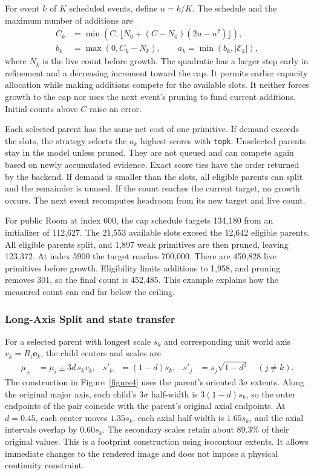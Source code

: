 For event $k$ of $K$ scheduled events, define $u=k/K$. The schedule and the maximum number of additions are
\begin{align}
 C_k &=\min(C,\lfloor N_0+(C-N_0)(2u-u^2)\rfloor),\\
 b_k&=\max(0,C_k-N_k),\qquad
 a_k=\min(b_k,|\mathcal E_k|),
 \label{eq:count}
\end{align}
where $N_k$ is the live count before growth. The quadratic has a larger step early in refinement and a decreasing increment toward the cap. It permits earlier capacity allocation while making additions compete for the available slots. It neither forces growth to the cap nor uses the next event's pruning to fund current additions. Initial counts above $C$ raise an error.

Each selected parent has the same net cost of one primitive. If demand exceeds the slots, the strategy selects the $a_k$ highest scores with \texttt{topk}. Unselected parents stay in the model unless pruned. They are not queued and can compete again based on newly accumulated evidence. Exact score ties have the order returned by the backend. If demand is smaller than the slots, all eligible parents can split and the remainder is unused. If the count reaches the current target, no growth occurs. The next event recomputes headroom from its new target and live count.

For public Room at index 600, the cap schedule targets 134,180 from an initializer of 112,627. The 21,553 available slots exceed the 12,642 eligible parents. All eligible parents split, and 1,897 weak primitives are then pruned, leaving 123,372. At index 5900 the target reaches 700,000. There are 450,828 live primitives before growth. Eligibility limits additions to 1,958, and pruning removes 301, so the final count is 452,485. This example explains how the measured count can end far below the ceiling.

\subsubsection{Long-Axis Split and state transfer}
For a selected parent with longest scale $s_k$ and corresponding unit world axis $v_k=R_i\mathbf e_k$, the child centers and scales are
\begin{align}
 \mu_\pm&=\mu_i\pm 3d\,s_k v_k,&
 s'_k&=(1-d)s_k,&
 s'_j&=s_j\sqrt{1-d^2}\quad (j\ne k).
 \label{eq:las}
\end{align}
The construction in Figure~\ref{figure4} uses the parent's oriented $3\sigma$ extents. Along the original major axis, each child's $3\sigma$ half-width is $3(1-d)s_k$, so the outer endpoints of the pair coincide with the parent's original axial endpoints. At $d=0.45$, each center moves $1.35s_k$, each axial half-width is $1.65s_k$, and the axial intervals overlap by $0.60s_k$. The secondary scales retain about 89.3\% of their original values. This is a footprint construction using isocontour extents. It allows immediate changes to the rendered image and does not impose a physical continuity constraint.

